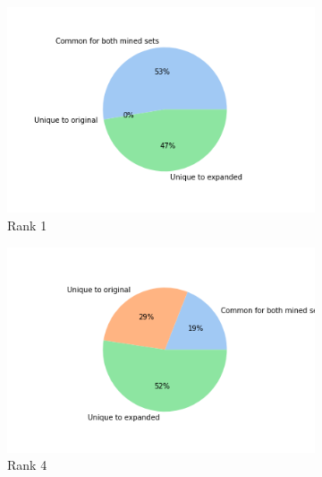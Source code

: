     
    \begin{figure}[h]
        \centering
        \begin{subfigure}[b]{0.3\textwidth}
            \centering
            \includegraphics[width=\textwidth]{figures/results/ranks/pie_charts/('rank_cutoff', 1)_wn18rr.png}
            \caption[]%
            {{\small Rank 1}}    
            \label{fig:rank_1_pie_wn18rr}
        \end{subfigure}
        \begin{subfigure}[b]{0.3\textwidth}  
            \centering 
            \includegraphics[width=\textwidth]{figures/results/ranks/pie_charts/('rank_cutoff', 4)_wn18rr.png}
            \caption[]%
            {{\small Rank 4}}    
            \label{fig:rank_4_pie_wn18rr}
        \end{subfigure}
        \begin{subfigure}[b]{0.3\textwidth}   

\end{subfigure}
\end{figure}
